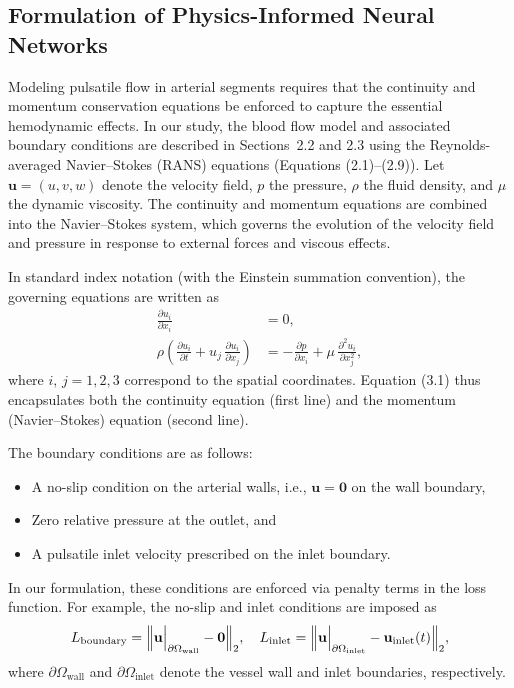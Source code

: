 \documentclass[12pt, a4paper]{article}
\begin{document}
\subsection{Formulation of Physics-Informed Neural Networks}
\label{sec:PINN_Formulation}

Modeling pulsatile flow in arterial segments requires that the continuity and momentum conservation equations be enforced to capture the essential hemodynamic effects. In our study, the blood flow model and associated boundary conditions are described in Sections~2.2 and 2.3 using the Reynolds-averaged Navier–Stokes (RANS) equations (Equations (2.1)–(2.9)). Let \(\mathbf{u} = (u,v,w)\) denote the velocity field, \(p\) the pressure, \(\rho\) the fluid density, and \(\mu\) the dynamic viscosity. The continuity and momentum equations are combined into the Navier–Stokes system, which governs the evolution of the velocity field and pressure in response to external forces and viscous effects.

In standard index notation (with the Einstein summation convention), the governing equations are written as
\[
\begin{aligned}
\frac{\partial u_i}{\partial x_i} &= 0, \\
\rho\left(\frac{\partial u_i}{\partial t} + u_j\,\frac{\partial u_i}{\partial x_j}\right) &= -\frac{\partial p}{\partial x_i} + \mu\,\frac{\partial^2 u_i}{\partial x_j^2},
\end{aligned}
\tag{3.1}
\]
where \(i,\,j=1,2,3\) correspond to the spatial coordinates. Equation (3.1) thus encapsulates both the continuity equation (first line) and the momentum (Navier–Stokes) equation (second line).

The boundary conditions are as follows:
\begin{itemize}
    \item A no-slip condition on the arterial walls, i.e., \(\mathbf{u} = \mathbf{0}\) on the wall boundary,
    \item Zero relative pressure at the outlet, and
    \item A pulsatile inlet velocity prescribed on the inlet boundary.
\end{itemize}
In our formulation, these conditions are enforced via penalty terms in the loss function. For example, the no-slip and inlet conditions are imposed as
\[
L_{\mathrm{boundary}} = \Bigl\|\mathbf{u}\Big|_{\partial\Omega_{\mathrm{wall}}} - \mathbf{0}\Bigr\|_2, \quad
L_{\mathrm{inlet}} = \Bigl\|\mathbf{u}\Big|_{\partial\Omega_{\mathrm{inlet}}} - \mathbf{u}_{\mathrm{inlet}}(t)\Bigr\|_2,
\]
where \(\partial\Omega_{\mathrm{wall}}\) and \(\partial\Omega_{\mathrm{inlet}}\) denote the vessel wall and inlet boundaries, respectively.
\end{document}
